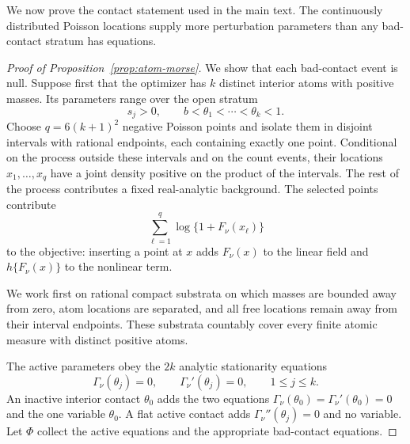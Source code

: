 We now prove the contact statement used in the main text. The continuously
distributed Poisson locations supply more perturbation parameters than any
bad-contact stratum has equations.
\begin{proof}[Proof of Proposition~\ref{prop:atom-morse}]
We show that each bad-contact event is null. Suppose first that the optimizer
has \(k\) distinct interior atoms with positive masses. Its parameters range
over the open stratum
\[
    s_j>0,
    \qquad b<\theta_1<\cdots<\theta_k<1.
\]
Choose \(q=6(k+1)^2\) negative Poisson points and isolate them in disjoint
intervals with rational endpoints, each containing exactly one point.
Conditional on the process outside these intervals and on the count events,
their locations \(x_1,\ldots,x_q\) have a joint density positive on the
product of the intervals. The rest of the process contributes a fixed
real-analytic background. The selected points contribute
\[
    \sum_{\ell=1}^q\log\{1+F_\nu(x_\ell)\}
\]
to the objective: inserting a point at \(x\) adds \(F_\nu(x)\) to the
linear field and \(h\{F_\nu(x)\}\) to the nonlinear term.

We work first on rational compact substrata on which masses are bounded away
from zero, atom locations are separated, and all free locations remain away
from their interval endpoints. These substrata countably cover every finite
atomic measure with distinct positive atoms.

The active parameters obey the \(2k\) analytic stationarity equations
\[
    \Gamma_\nu(\theta_j)=0,
    \qquad
    \Gamma_\nu'(\theta_j)=0,
    \qquad 1\le j\le k.
\]
An inactive interior contact \(\theta_0\) adds the two equations
\(\Gamma_\nu(\theta_0)=\Gamma_\nu'(\theta_0)=0\) and the one variable
\(\theta_0\). A flat active contact adds
\(\Gamma_\nu''(\theta_j)=0\) and no variable. Let \(\Phi\) collect the
active equations and the appropriate bad-contact equations.


\end{proof}
